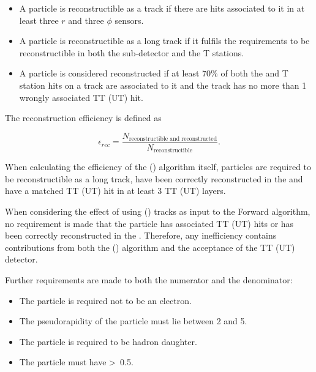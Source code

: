 \begin{itemize}

\item A particle is reconstructible as a \velo track if there are hits associated to it in at least three $r$ and three $\phi$ \velo sensors.

\item A particle is reconstructible as a long track if it fulfils the requirements to be reconstructible in both the \velo sub-detector and the T stations.

\item A particle is considered reconstructed if at least 70\% of both the \velo and T station hits on a track are associated to it and the track has no more than 1 wrongly associated TT (UT) hit.

\end{itemize}

\noindent The reconstruction efficiency is defined as

\begin{equation}
\epsilon_{rec} = \frac{N_{\text{reconstructible~and~reconstructed}}}{N_{\text{reconstructible}}}.
\end{equation}

When calculating the efficiency of the \velott (\velout) algorithm itself, particles are required to be reconstructible as a long track, have been correctly reconstructed in the \velo and have a matched TT (UT) hit in at least 3 TT (UT) layers. 

When considering the effect of using \velott (\velout) tracks as input to the Forward algorithm, no requirement is made that the particle has associated TT (UT) hits or has been correctly reconstructed in the \velo. Therefore, any inefficiency contains contributions from both the \velott (\velout) algorithm and the acceptance of the TT (UT) detector. 

Further requirements are made to both the numerator and the denominator:

\begin{itemize}
\item The particle is required not to be an electron.
\item The pseudorapidity of the particle must lie between 2 and 5.
\item The particle is required to be \bquark hadron daughter.
\item The particle must have \pt\textgreater~0.5\gevc.
\end{itemize}

